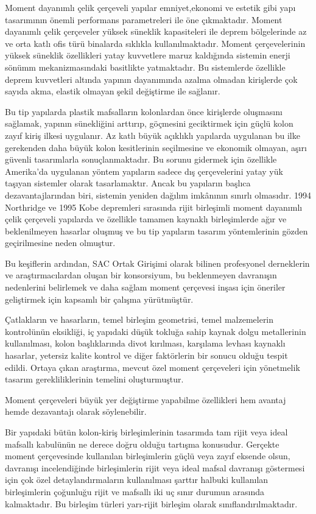Moment dayanımlı çelik çerçeveli yapılar emniyet,ekonomi ve estetik
gibi yapı tasarımının önemli performans parametreleri ile öne çıkmaktadır.
Moment dayanımlı çelik çerçeveler yüksek süneklik kapasiteleri ile
deprem bölgelerinde az ve orta katlı ofis türü binalarda sıklıkla
kullanılmaktadır. Moment çerçevelerinin yüksek süneklik özellikleri
yatay kuvvetlere maruz kaldığında sistemin enerji sönümm mekanizmasındaki
basitlikte yatmaktadır. Bu sistemlerde özellikle deprem kuvvetleri
altında yapının dayanımında azalma olmadan kirişlerde çok sayıda akma,
elastik olmayan şekil değiştirme ile sağlanır.

Bu tip yapılarda plastik mafsalların kolonlardan önce kirişlerde oluşmasını
sağlamak, yapının sünekliğini arttırıp, göçmesini geciktirmek için
güçlü kolon zayıf kiriş ilkesi uygulanır. Az katlı büyük açıklıklı
yapılarda uygulanan bu ilke gerekenden daha büyük kolon kesitlerinin
seçilmesine ve ekonomik olmayan, aşırı güvenli tasarımlarla sonuçlanmaktadır.
Bu sorunu gidermek için özellikle Amerika’da uygulanan yöntem yapıların
sadece dış çerçevelerini yatay yük taşıyan sistemler olarak tasarlamaktır.
Ancak bu yapıların başlıca dezavantajlarından biri, sistemin yeniden
dağılım imkânının sınırlı olmasıdır. 1994 Northridge ve 1995 Kobe
depremleri sırasında rijit birleşimli moment dayanımlı çelik çerçeveli
yapılarda ve özellikle tamamen kaynaklı birleşimlerde ağır ve beklenilmeyen
hasarlar oluşmuş ve bu tip yapıların tasarım yöntemlerinin gözden
geçirilmesine neden olmuştur.

Bu keşiflerin ardından, SAC Ortak Girişimi olarak bilinen profesyonel
derneklerin ve araştırmacılardan oluşan bir konsorsiyum, bu beklenmeyen
davranışın nedenlerini belirlemek ve daha sağlam moment çerçevesi
inşası için öneriler geliştirmek için kapsamlı bir çalışma yürütmüştür.

Çatlakların ve hasarların, temel birleşim geometrisi, temel malzemelerin
kontrolünün eksikliği, iç yapıdaki düşük tokluğa sahip kaynak dolgu
metallerinin kullanılması, kolon başlıklarında divot kırılması, karşılama
levhası kaynaklı hasarlar, yetersiz kalite kontrol ve diğer faktörlerin
bir sonucu olduğu tespit edildi. Ortaya çıkan araştırma, mevcut özel
moment çerçeveleri için yönetmelik tasarım gerekliliklerinin temelini
oluşturmuştur.

Moment çerçeveleri büyük yer değiştirme yapabilme özellikleri hem
avantaj hemde dezavantajı olarak söylenebilir. 

Bir yapıdaki bütün kolon-kiriş birleşimlerinin tasarımda tam rijit
veya ideal mafsallı kabulünün ne derece doğru olduğu tartışma konusudur.
Gerçekte moment çerçevesinde kullanılan birleşimlerin güçlü veya zayıf
eksende olsun, davranışı incelendiğinde birleşimlerin rijit veya ideal
mafsal davranışı göstermesi için çok özel detaylandırmaların kullanılması
şarttır halbuki kullanılan birleşimlerin çoğunluğu rijit ve mafsallı
iki uç sınır durumun arasında kalmaktadır. Bu birleşim türleri yarı-rijit
birleşim olarak sınıflandırılmaktadır. 

